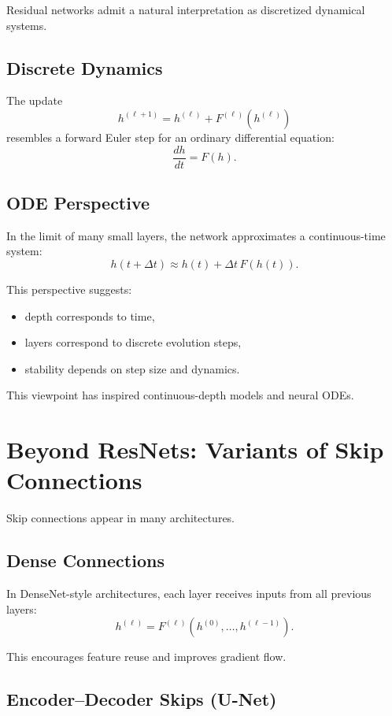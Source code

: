 Residual networks admit a natural interpretation as discretized dynamical systems.

\subsection{Discrete Dynamics}

The update
\[
h^{(\ell+1)} = h^{(\ell)} + F^{(\ell)}(h^{(\ell)})
\]
resembles a forward Euler step for an ordinary differential equation:
\[
\frac{dh}{dt} = F(h).
\]

\subsection{ODE Perspective}

In the limit of many small layers, the network approximates a continuous-time system:
\[
h(t+\Delta t) \approx h(t) + \Delta t \, F(h(t)).
\]

This perspective suggests:
\begin{itemize}
    \item depth corresponds to time,
    \item layers correspond to discrete evolution steps,
    \item stability depends on step size and dynamics.
\end{itemize}

This viewpoint has inspired continuous-depth models and neural ODEs.

\section{Beyond ResNets: Variants of Skip Connections}

Skip connections appear in many architectures.

\subsection{Dense Connections}

In DenseNet-style architectures, each layer receives inputs from all previous layers:
\[
h^{(\ell)} = F^{(\ell)}(h^{(0)}, \dots, h^{(\ell-1)}).
\]

This encourages feature reuse and improves gradient flow.

\subsection{Encoder--Decoder Skips (U-Net)}

